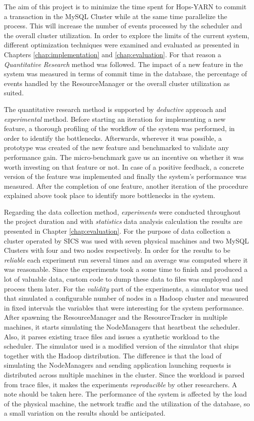 The aim of this project is to minimize the time spent for Hops-YARN to commit
a transaction in the MySQL Cluster while at the same time parallelize the
process. This will increase the number of events processed by the
scheduler and the overall cluster utilization. In order to explore
the limits of the current system, different optimization techniques
were examined and evaluated as presented in Chapters
\ref{chap:implementation} and \ref{chap:evaluation}. For that reason a
\emph{Quantitative Research} method was followed. The impact of a new
feature in the system was measured in terms of commit time in the
database, the percentage of events handled by the ResourceManager or
the overall cluster utilization as suited.

The quantitative research method is supported by \emph{deductive}
approach and \emph{experimental} method. Before starting an iteration for
implementing a new feature, a thorough profiling of the
workflow of the system was performed, in order to identify the bottlenecks. Afterwards,
wherever it was possible, a prototype was created of the new
feature and benchmarked to validate any performance
gain. The micro-benchmark gave us an incentive on whether it was worth
investing on that feature or not. In case of a positive feedback,
a concrete version of the feature was implemented and finally the system's
performance was measured. After the completion of one feature, another iteration of the
procedure explained above took place to identify more bottlenecks in the system.

Regarding the data collection method, \emph{experiments} were
conducted throughout the project duration and with \emph{statistics}
data analysis calculation the results are presented in Chapter
\ref{chap:evaluation}. For the purpose of data collection a
cluster operated by SICS was used with seven physical machines and two MySQL
Clusters with four and two nodes respectively. In order for the
results to be \emph{reliable} each experiment run several times and
an average was computed where it was reasonable. Since the experiments took a
some time to finish and produced a lot of valuable data, custom
code to dump these data to files was employed and process them later. For the
\emph{validity} part of the experiments, a simulator was used that
simulated a configurable number of nodes in a Hadoop cluster and
measured in fixed intervals the variables that were interesting for
the system performance. After spawning the ResourceManager and the
ResourceTracker in multiple machines, it starts simulating the
NodeManagers that heartbeat the scheduler. Also, it parses existing
trace files and issues a synthetic workload to the scheduler. The simulator used is a
modified version of the simulator that ships together with the Hadoop
distribution. The difference is that the load of simulating the
NodeManagers and sending application launching requests is distributed across
multiple machines in the cluster. Since the workload is parsed from
trace files, it makes the experiments \emph{reproducible} by other
researchers. A note should be taken here. The performance of the system is affected
by the load of the physical machine, the network traffic and the
utilization of the database, so a small variation on the results
should be anticipated.
